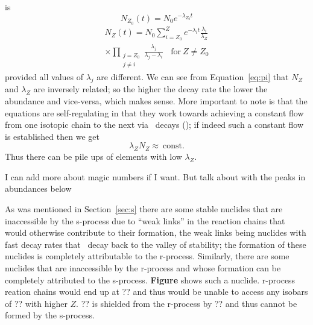 {\cite{iliadis2008} is
\begin{equation}
N_{Z_0}(t) = N_0 e^{-\lambda_{Z_0} t}
\end{equation}
\begin{multline}
\label{eq:pi}
N_Z(t) = N_0 \sum_{i=Z_0}^Z e^{-\lambda_i
  t}\frac{\lambda_i}{\lambda_Z} \\
\times \prod_{\substack{j=Z_0\\ j\neq i}} \frac{\lambda_j}{\lambda_j -
  \lambda_i}~~~~\textrm{for}~Z\neq Z_0
\end{multline}
provided all values of $\lambda_j$ are different.  
We can see from Equation~\ref{eq:pi} that $N_Z$ and $\lambda_Z$ are
inversely related; so the higher the decay rate the lower the
abundance and vice-versa, which makes sense.  More important to note
is that the equations are self-regulating in that they work towards
achieving a constant flow from one isotopic chain to the next via
\bminus\ decays (\citealt{iliadis2008}); if indeed such a constant
flow is established then we get
\begin{equation}
\lambda_ZN_Z \approx ~ \textrm{const}.
\end{equation}
Thus there can be pile ups of elements with low $\lambda_Z$.

I can add more about magic numbers if I want.  But talk about with the
peaks in abundances below

As was mentioned in Section~\ref{sec:s} there are some stable nuclides
that are inaccessible by the s-process due to ``weak links'' in the
reaction chains that would otherwise contribute to their formation,
the weak links being nuclides with fast decay rates that \bminus\
decay back to the valley of stability; the formation of these nuclides
is completely attributable to the r-process.  Similarly, there are
some nuclides that are inaccessible by the r-process and whose
formation can be completely attributed to the s-process.  {\bf Figure}
shows such a nuclide.  r-process reation chains would end up at ?? and
thus would be unable to access any isobars of ?? with higher $Z$.  ??
is shielded from the r-process by ?? and thus cannot be formed by the
s-process.

}

